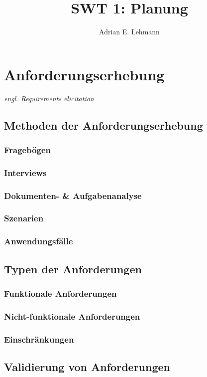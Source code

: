 \documentclass[a4paper]{article}
\title{SWT 1: Planung}
\author{Adrian E. Lehmann}
\theoremstyle{break}
\begin{document}
	\maketitle
	\tableofcontents
	\newpage

	
\section{Anforderungserhebung}
	\textit{engl. Requirements elicitation}
\subsection{Methoden der Anforderungserhebung}	
\subsubsection{Fragebögen}
\subsubsection{Interviews}
\subsubsection{Dokumenten- \& Aufgabenanalyse}
\subsubsection{Szenarien}
\subsubsection{Anwendungsfälle}
\subsection{Typen der Anforderungen}
\subsubsection{Funktionale Anforderungen}
\subsubsection{Nicht-funktionale Anforderungen}
\subsubsection{Einschränkungen}
\subsection{Validierung von Anforderungen}
\end{document}
